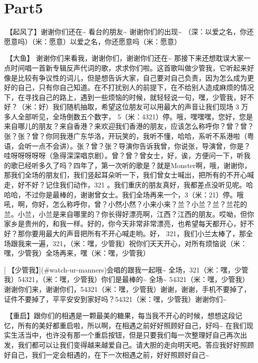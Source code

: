 \documentclass[
]{book}
\begin{document}
\section{Part5}\label{chongqing-20241007-part5}

🎵【起风了】谢谢你们还在\textasciitilde{} 看台的朋友\textasciitilde{} 谢谢你们的出现\textasciitilde{} （深：以爱之名，你还愿意吗）（米：愿意）以爱之名，你还愿意吗（米：愿意）

🎵【大鱼】
谢谢你们来看我，谢谢你们，谢谢你们还在\textasciitilde{}
那接下来还想耽误大家一点时间唱一首新专辑反声代词的歌，求求你们啦。这首歌叫做少管我，它听起来好像是比较有争议性的词儿，但是想告诉大家，自己要对自己负责，因为怎么成为更好的自己，只有你自己知道。在不打扰别人的前提下，在不给别人造成麻烦的情况下，在寻找自己的路上，遇到一些烦恼的时候，就轻轻说一句，嘿，少管我，好不好？（米：好）我们随机抽取，希望这位朋友可以用最大的声音让我们现场 3 万多人全部听见，全场倒数五个数字， 5（米：4321）停。哦，嘿嘿嘿，您好，您是来自哪儿的朋友？来自香港？来欢迎我们香港的朋友，应该怎么称呼你？曾？曾？张？张？曾？你同我港广东华洛，开玩笑的，我听不懂，哈哈，系听不系港啦（粤语，会听一点不会讲）。张？曾？张？导演你告诉我曾，你说张，导演曾，你是？哇呀呀呀呀呀（急得深深唱京剧）。曾？曾？曾女士，好，诶，方便问一下，听我的歌已经听多久了吗？四年了，第一次听的歌是？就是Monster啊，哦，谢谢你，那我们全场的朋友们，我们竖起耳朵听一下，我们曾女士喊出，把所有的不开心喊走，好不好？记住我们动作，321 。我们重庆的朋友真好，我都差点没听见呢。哈哈哈，不过你是最棒的，谢谢曾女士。我们全场再来一个，3（米：21）停。哦吼，啊，你好，怎么称呼你，曾？小然小然？小来小来？兰？小兰？兰？兰花的兰。小兰，小兰是来自哪里的？你长得好漂亮啊，江西？江西的朋友。哎呦，但你家乡是贵州的，和我一样。好的，你今天非常非常漂亮，也希望每天都开心，好不好？那你要用最大的声音把所有不开心喊走哟。好， 321，我们小兰太棒了，那全场跟我来一遍，321，（米：嘿，少管我）祝你们天天开心，对所有烦恼说（米：嘿，少管我）全场再来，嘿（米：嘿，少管我）

[🎵【少管我】](#watch-ur-manners)会唱的跟我一起哦\textasciitilde{} 全场，321（米：嘿，少管我）54321，（米：嘿，少管我）你们是最棒的\textasciitilde{} 全场\textasciitilde{} 54321（米：嘿，少管我）谢谢你们来，谢谢你们，54321（米：嘿，少管我）谢谢，谢谢，手机不要掉了，证件不要掉了，平平安安到家好吗？54321（米：嘿，少管我）谢谢你们\textasciitilde{}

🎵【重启】跟你们的相遇是一颗最美的糖果，每当我不开心的时候，想想这段记忆，所有的美好都重启啦，所以啊，在相遇之前好好照顾好自己，好吗\textasciitilde{} 在我们现实生活当中，也许没有那一个重启按钮，但是只要我们每一次整理好自己再次出发，我们都可以让我们变得越来越爱自己。请大胆的走向明天吧。答应我好好照顾好自己，我们一定会相遇的，在下一次相遇之前，好好照顾好自己\textasciitilde{}
\end{document}
